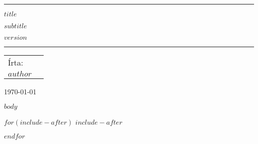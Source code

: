 \documentclass[a4paper]{report}
\begin{document}
\begin{titlepage}
  \scshape
  \center
  \vspace{1cm}
  
  
  \raisebox{-\baselineskip}{\rule{\textwidth}{1px}}
  \rule{\textwidth}{1px}
  \vspace{0.2cm}
  
  {\huge{{$title$}}}\par \vspace{0.1cm}
  {\Large{{$subtitle$}}}\par \vspace{0.1cm}
  $version$

  \rule{\textwidth}{2px}
  
  \vspace{1cm}
  
  \begin{tabularx}{\textwidth}{X r}
      Írta:\\
      \large{$author$}\\
  \end{tabularx}
  
  \vspace{2.3cm}
  
  
  \vfill
  \today
  
\end{titlepage}

$body$

$for(include-after)$
$include-after$

$endfor$
\end{document}
